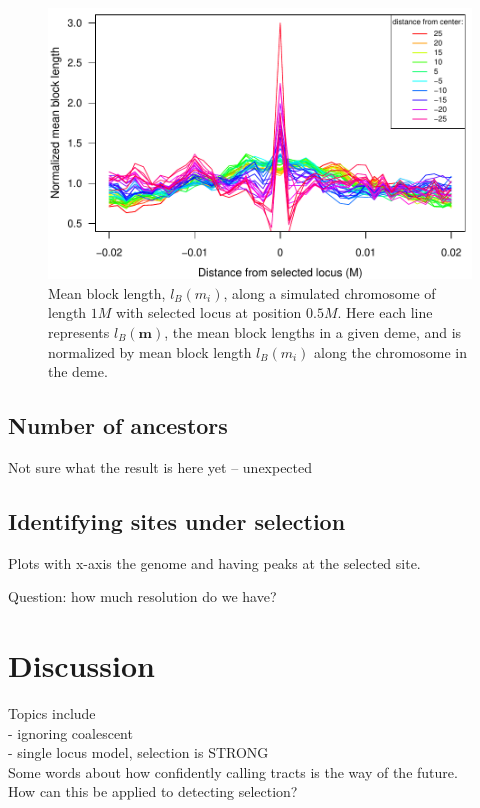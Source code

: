 \documentclass[12pt]{article}
\begin{document}
\begin{figure}
\includegraphics{figs/blocksAlongChromAncBConditioning}
\caption{Mean block length, $l_B(m_i)$, along a simulated chromosome of length $1M$ with selected locus at position $0.5M$. Here each line represents  $l_B(\mathbf{m})$, the mean block lengths in a given deme, and is normalized by mean block length $l_B(m_i)$ along the chromosome in the deme.}\label{Fig:blockLengths}
\end{figure}

\subsection*{Number of ancestors}
Not sure what the result is here yet -- unexpected

\subsection*{Identifying sites under selection}

Plots with x-axis the genome and having peaks at the selected site.

Question: how much resolution do we have?

\section{Discussion}
Topics include\\
- ignoring coalescent\\
- single locus model, selection is STRONG\\

Some words about how confidently calling tracts is the way of the future.\\
How can this be applied to detecting selection?
\end{document}
